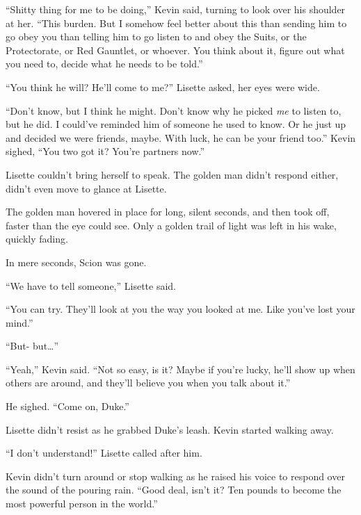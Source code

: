 ``Shitty thing for me to be doing,'' Kevin said, turning to look over his shoulder at her.  ``This burden.  But I somehow feel better about this than sending him to go obey you than telling him to go listen to and obey the Suits, or the Protectorate, or Red Gauntlet, or whoever.  You think about it, figure out what you need to, decide what he needs to be told.''



``You think he will?  He'll come to me?''  Lisette asked, her eyes were wide.



``Don't know, but I think he might.  Don't know why he picked \emph{me} to listen to, but he did.  I could've reminded him of someone he used to know.  Or he just up and decided we were friends, maybe.  With luck, he can be your friend too.''  Kevin sighed, ``You two got it?  You're partners now.''



Lisette couldn't bring herself to speak.  The golden man didn't respond either, didn't even move to glance at Lisette.



The golden man hovered in place for long, silent seconds, and then took off, faster than the eye could see.  Only a golden trail of light was left in his wake, quickly fading.



In mere seconds, Scion was gone.



``We have to tell someone,'' Lisette said.



``You can try.  They'll look at you the way you looked at me.  Like you've lost your mind.''



``But- but\ldots''



``Yeah,'' Kevin said.  ``Not so easy, is it?  Maybe if you're lucky, he'll show up when others are around, and they'll believe you when you talk about it.''



He sighed.  ``Come on, Duke.''



Lisette didn't resist as he grabbed Duke's leash.  Kevin started walking away.



``I don't understand!'' Lisette called after him.



Kevin didn't turn around or stop walking as he raised his voice to respond over the sound of the pouring rain.  ``Good deal, isn't it?  Ten pounds to become the most powerful person in the world.''





